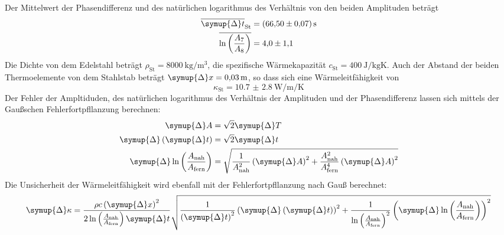 Der Mittelwert der Phasendifferenz und des natürlichen logarithmus des Verhältnis von den beiden Amplituden beträgt
\begin{align}
  \overline{\symup{\Delta} t}_\text{St}                     & = \SI{66.50(7)}{\second} \\
  \overline{\ln \left (  \frac{A_7}{A_8} \right)} & = \num{4.0(11)}
\end{align}
Die Dichte von dem Edelstahl beträgt $\rho_\text{St} = \SI{8000}{\kilogram\per\cubic\metre}$, die spezifische Wärmekapazität 
$c_\text{St} = \SI{400}{\joule\per\kilogram\kelvin}$. Auch der Abstand der beiden Thermoelemente von dem Stahlstab
beträgt $\symup{\Delta} x = \SI{0.03}{\metre}$, so dass sich eine Wärmeleitfähigkeit von
\begin{equation}
  \kappa_\text{St} = \SI{10.7(28)}{\watt\per\metre\per\kelvin}
\end{equation} 
Der Fehler der Ampltiduden, des natürlichen logarithmus des Verhältnis der Amplituden und der Phasendifferenz 
lassen sich mittels der Gaußschen Fehlerfortpfllanzung berechnen:
\begin{align}
  \symup{\Delta} A                                                      &= \sqrt{2} \symup{\Delta} T \\
  \symup{\Delta} \left (\symup{\Delta} t \right )                       &= \sqrt{2} \symup{\Delta} t \\
  \symup{\Delta} \ln \left ( \frac{A_\text{nah}}{A_\text{fern}} \right) &= 
  \sqrt{\frac{1}{A_\text{nah}^2} \left ( \symup{\Delta} A \right )^2 + 
  \frac{A_\text{nah}^2}{A_\text{fern}^4} \left ( \symup{\Delta} A \right ) ^2} 
\end{align}
Die Unsicherheit der Wärmeleitfähigkeit wird ebenfall mit der Fehlerfortpfllanzung nach Gauß berechnet:
\begin{equation} 
  \symup{\Delta} \kappa = \frac{\rho c \left ( \symup{\Delta} x \right )^2 }
  {2\ln \left ( \frac{A_\text{nah}}{A_\text{fern}} \right ) \symup{\Delta} t} 
  \sqrt{\frac{1}{\left( \symup{\Delta} t\right)^2}
  \left ( \symup{\Delta} \left ( \symup{\Delta} t \right ) \right )^2 + \frac{1}{ \ln \left ( \frac{A_\text{nah}}{A_\text{fern}} \right )^2}
 \left (  \symup{\Delta} \ln \left ( \frac{A_\text{nah}}{A_\text{fern}} \right ) \right )^2}
\end{equation}